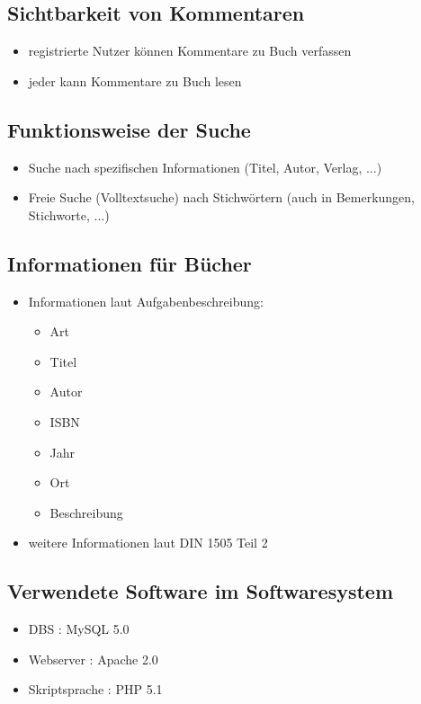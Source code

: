 			\subsection{Sichtbarkeit von Kommentaren}
			\begin{itemize}
				\item registrierte Nutzer können Kommentare zu Buch verfassen
				\item jeder kann Kommentare zu Buch lesen
			\end{itemize}
			\subsection{Funktionsweise der Suche}
			\begin{itemize}
				\item Suche nach spezifischen Informationen (Titel, Autor, Verlag, ...)
				\item Freie Suche (Volltextsuche) nach Stichwörtern (auch in Bemerkungen, Stichworte, ...)
			\end{itemize}
			\subsection{Informationen für Bücher}
			\begin{itemize}
				\item Informationen laut Aufgabenbeschreibung:
					\begin{itemize}
						\item Art
						\item Titel
						\item Autor
						\item ISBN
						\item Jahr
						\item Ort
						\item Beschreibung
					\end{itemize}
				\item weitere Informationen laut DIN 1505 Teil 2
			\end{itemize}
			\subsection{Verwendete Software im Softwaresystem}
			\begin{itemize}
				\item DBS
					: MySQL 5.0
				\item Webserver
					: Apache 2.0
				\item Skriptsprache
					: PHP 5.1
			\end{itemize}
